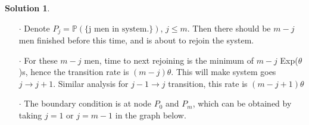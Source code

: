 \documentclass[a4paper, 10pt]{article}
\theoremstyle{definition}
\theoremstyle{hSol}
\newtheorem*{solution}{Solution}
\begin{document}
\begin{solution} ~
\begin{itemize}
  \item[$\cdot$] Denote $P_j=\mathbb{P}\left(\{\text{j men in system.}\}\right)$, $j\leq m$. Then there should be $m-j$ men finished before this time, and is about to rejoin the system.
  \item[$\cdot$] For these $m-j$ men, time to next rejoining is the minimum of $m-j$ Exp($\theta$)s, hence the transition rate is $(m-j)\theta$. This will make system goes $j\to j+1$. Similar analysis for $j-1\to j$ transition, this rate is $(m-j+1)\theta$
  \item[$\cdot$] The boundary condition is at node $P_0$ and $P_m$, which can be obtained by taking $j=1$ or $j=m-1$ in the graph below.
\end{itemize}
\begin{center}
\end{center}
\end{solution}
\end{document}
